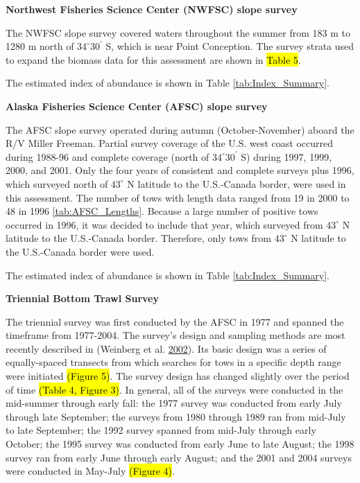 \documentclass[12pt,]{article}
\begin{document}
\textbf{Northwest Fisheries Science Center (NWFSC) slope survey}

The NWFSC slope survey covered waters throughout the summer from 183 m
to 1280 m north of \(34^\circ 30^\prime\) S, which is near Point
Conception. The survey strata used to expand the biomass data for this
assessment are shown in \hl{Table 5}.

The estimated index of abundance is shown in Table
\ref{tab:Index_Summary}.

\textbf{Alaska Fisheries Science Center (AFSC) slope survey}

The AFSC slope survey operated during autumn (October-November) aboard
the R/V Miller Freeman. Partial survey coverage of the U.S. west coast
occurred during 1988-96 and complete coverage (north of
\(34^\circ 30^\prime\) S) during 1997, 1999, 2000, and 2001. Only the
four years of consistent and complete surveys plus 1996, which surveyed
north of \(43^\circ\) N latitude to the U.S.-Canada border, were used in
this assessment. The number of tows with length data ranged from 19 in
2000 to 48 in 1996 \ref{tab:AFSC_Lengths}. Because a large number of
positive tows occurred in 1996, it was decided to include that year,
which surveyed from \(43^\circ\) N latitude to the U.S.-Canada border.
Therefore, only tows from \(43^\circ\) N latitude to the U.S.-Canada
border were used.

The estimated index of abundance is shown in Table
\ref{tab:Index_Summary}.

\textbf{Triennial Bottom Trawl Survey}

The triennial survey was first conducted by the AFSC in 1977 and spanned
the timeframe from 1977-2004. The survey's design and sampling methods
are most recently described in (Weinberg et al.
\protect\hyperlink{ref-weinberg_estimation_2002}{2002}). Its basic
design was a series of equally-spaced transects from which searches for
tows in a specific depth range were initiated \hl{(Figure 5)}. The
survey design has changed slightly over the period of time
\hl{(Table 4, Figure 3)}. In general, all of the surveys were conducted
in the mid-summer through early fall: the 1977 survey was conducted from
early July through late September; the surveys from 1980 through 1989
ran from mid-July to late September; the 1992 survey spanned from
mid-July through early October; the 1995 survey was conducted from early
June to late August; the 1998 survey ran from early June through early
August; and the 2001 and 2004 surveys were conducted in May-July
\hl{(Figure 4)}.
\end{document}

